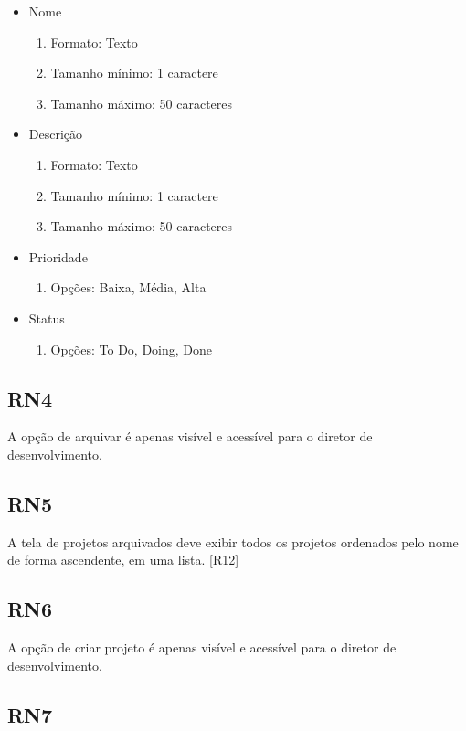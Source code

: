 \begin{itemize}
  \item Nome
  \begin{enumerate}
    \item Formato: Texto
    \item Tamanho mínimo: 1 caractere
    \item Tamanho máximo: 50 caracteres
  \end{enumerate}
  \item Descrição
  \begin{enumerate}
    \item Formato: Texto
    \item Tamanho mínimo: 1 caractere
    \item Tamanho máximo: 50 caracteres
  \end{enumerate}
  \item Prioridade
  \begin{enumerate}
    \item Opções: Baixa, Média, Alta
  \end{enumerate}
  \item Status
  \begin{enumerate}
    \item Opções: To Do, Doing, Done
  \end{enumerate}
\end{itemize}

\subsection{RN4}

A opção de arquivar é apenas visível e acessível para o diretor de desenvolvimento.

\subsection{RN5}

A tela de projetos arquivados deve exibir todos os projetos ordenados pelo nome de forma ascendente, em uma lista. [R12]

\subsection{RN6}

A opção de criar projeto é apenas visível e acessível para o diretor de desenvolvimento.

\subsection{RN7}

